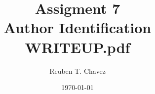 \documentclass[11pt]{article} %
\title{Assigment 7 \\
    \large Author Identification\\
     \textbf{WRITEUP.pdf}}
\author{Reuben T. Chavez}
\date{\today} %
\begin{document}
\maketitle %



\pagebreak
\end{document}
